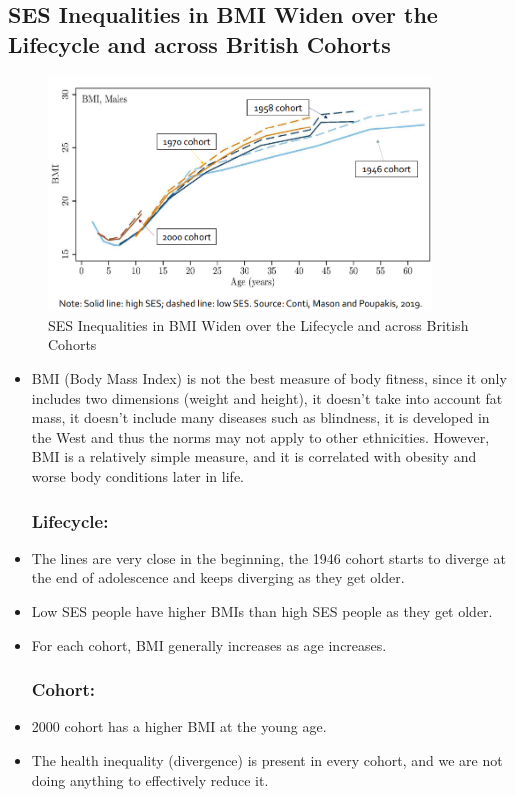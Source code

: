 \subsection{SES Inequalities in BMI Widen over the Lifecycle and across British Cohorts}
\begin{figure}[H]%
                \centering
                \includegraphics[width=4in]{images/ch3/27.png}
                \caption{SES Inequalities in BMI Widen over the Lifecycle and across British Cohorts}
                \label{fig:label}
            \end{figure}
\begin{itemize}
        \item BMI (Body Mass Index) is not the best measure of body fitness, since it only includes two dimensions (weight and height), it doesn't take into account fat mass, it doesn't include many diseases such as blindness, it is developed in the West and thus the norms may not apply to other ethnicities. However, BMI is a relatively simple measure, and it is correlated with obesity and worse body conditions later in life.
        \subsubsection{Lifecycle:}
        \item The lines are very close in the beginning, the 1946 cohort starts to diverge at the end of adolescence and keeps diverging as they get older. 
        \item Low SES people have higher BMIs than high SES people as they get older.
        \item For each cohort, BMI generally increases as age increases. 
        \subsubsection{Cohort:}
        \item 2000 cohort has a higher BMI at the young age.
        \item The health inequality (divergence) is present in every cohort, and we are not doing anything to effectively reduce it.
\end{itemize}       
        
